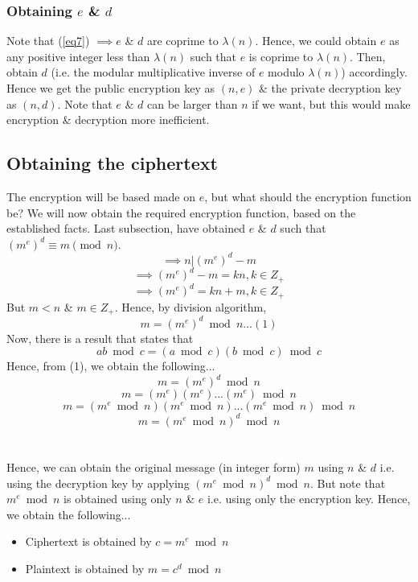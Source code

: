 \subsubsection{Obtaining $e$ \& $d$ }
Note that (\ref{eq7}) $\implies e$ \& $d$ are coprime to $\lambda(n)$. Hence, we could obtain $e$ as any positive integer less than $\lambda(n)$ such that $e$ is coprime to $\lambda(n)$. Then, obtain $d$ (i.e. the  modular multiplicative inverse of $e$ modulo $\lambda(n)$) accordingly. Hence we get the public encryption key as $(n, e)$ \& the private decryption key as $(n, d)$. Note that $e$ \& $d$ can be larger than $n$ if we want, but this would make encryption \& decryption more inefficient.

\subsection{Obtaining the ciphertext}
The encryption will be based made on $e$, but what should the encryption function be? We will now obtain the required encryption function, based on the established facts. Last subsection, have obtained $e$ \& $d$ such that $(m^e)^d \equiv m \pmod n$.
\[\implies n | (m^e)^d - m\]
\[\implies (m^e)^d - m = kn, k \in Z_+\]
\[\implies (m^e)^d = kn + m, k \in Z_+\]
But $m<n$ \& $m \in Z_+$. Hence, by division algorithm,
\[m = (m^e)^d \bmod n ... (1)\]
Now, there is a result that states that
\[ab \bmod c = (a \bmod c)(b \bmod c) \bmod c\]
Hence, from (1), we obtain the following...
\[m = (m^e)^d \bmod n\]
\[m = (m^e)(m^e)...(m^e) \bmod n\]
\[m = (m^e \bmod n)(m^e \bmod n)...(m^e \bmod n) \bmod n\]
\begin{equation}m = (m^e \bmod n)^d \bmod n\end{equation}
\\~\\
Hence, we can obtain the original message (in integer form) $m$ using $n$ \& $d$ i.e. using the decryption key by applying $(m^e \bmod n)^d \bmod n$. But note that $m^e \bmod n$ is obtained using only $n$ \& $e$ i.e. using only the encryption key. Hence, we obtain the following...

\begin{itemize}
	\item Ciphertext is obtained by $c = m^e \bmod n$
	\item Plaintext is obtained by $m = c^d \bmod n$
\end{itemize}

